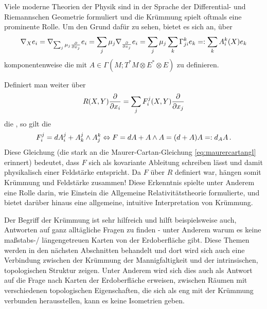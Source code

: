 \documentclass[../H_Analysis_main.tex]{subfiles}
\begin{document}
\begin{bsp}
Viele moderne Theorien der Physik sind in der Sprache der Differential- und Riemannschen Geometrie formuliert und die Krümmung spielt oftmals eine prominente Rolle. Um den Grund dafür zu sehen, bietet es sich an, über
\begin{equation}
\nabla_X e_i = \nabla_{\sum_j \mu_j \pdv{x_j}} e_i = \sum_j \mu_j \nabla_{\pdv{x_j}} e_i = \sum_j \mu_j \sum_k \Gamma_{ji}^k e_k =: \sum_k A_i^k(X) e_k
\end{equation}
komponentenweise die  mit $A \in \Gamma(M; T^*M \otimes E^* \otimes E)$ zu definieren.

Definiert man weiter über
\begin{equation}
R(X, Y) \pdv{x_i} = \sum_j F_i^j(X, Y) \pdv{x_j}
\end{equation}
die , so gilt die 
\begin{equation}
F_i^j = dA_i^j + A_k^j \wedge A_j^k \Leftrightarrow F = dA + A \wedge A = \qty(d + A) A =: d_A A \, .
\end{equation}
Diese Gleichung (die stark an die Maurer-Cartan-Gleichung \eqref{eq:maurercartangl} erinnert) bedeutet, dass $F$ sich als kovariante Ableitung\footnotemark{} schreiben lässt und damit physikalisch einer Feldstärke entspricht. Da $F$ über $R$ definiert war, hängen somit Krümmung und Feldstärke zusammen! Diese Erkenntnis spielte unter Anderem eine Rolle darin, wie Einstein die Allgemeine Relativitätstheorie formulierte, und bietet darüber hinaus eine allgemeine, intuitive Interpretation von Krümmung.
\end{bsp}


Der Begriff der Krümmung ist sehr hilfreich und hilft beispielsweise auch, Antworten auf ganz alltägliche Fragen zu finden - unter Anderem warum es keine maßstabs-/ längengetreuen Karten von der Erdoberfläche gibt. Diese Themen werden in den nächsten Abschnitten behandelt und dort wird sich auch eine Verbindung zwischen der Krümmung der Mannigfaltigkeit und der intrinsischen, topologischen Struktur zeigen. Unter Anderem wird sich dies auch als Antwort auf die Frage nach Karten der Erdoberfläche erweisen, zwischen Räumen mit verschiedenen topologischen Eigenschaften, die sich als eng mit der Krümmung verbunden herausstellen, kann es keine Isometrien geben.
\end{document}
